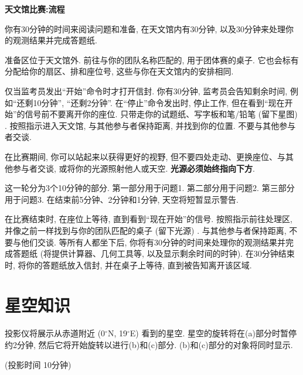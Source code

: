 \documentclass[a4paper,fontset=fandol]{ctexart}
\begin{document}
	{
		\Large\bfseries\noindent 天文馆比赛:\hspace{0.5em}流程
	}
	
	你有30分钟的时间来阅读问题和准备, 在天文馆内有30分钟, 以及30分钟来处理你的观测结果并完成答题纸. 
	
	准备区位于天文馆外. 前往与你的团队名称匹配的, 用于团体赛的桌子. 它也会标有分配给你的扇区、排和座位号, 这些与你在天文馆内的安排相同. 
	
	仅当监考员发出``开始''命令时才打开信封. 你有30分钟, 监考员会告知剩余时间, 例如``还剩10分钟'', ``还剩2分钟''. 在``停止''命令发出时, 停止工作, 但在看到``现在开始''的信号前不要离开你的座位. 只带走你的试题纸、写字板和笔/铅笔 (留下星图) . 按照指示进入天文馆, 与其他参与者保持距离, 并找到你的位置. 不要与其他参与者交谈. 
	
	在比赛期间, 你可以站起来以获得更好的视野, 但不要四处走动、更换座位、与其他参与者交谈, 或将你的光源照射他人或天空. \textbf{光源必须始终指向下方}. 
	
	这一轮分为3个10分钟的部分. 第一部分用于问题1. 第二部分用于问题2. 第三部分用于问题3. 在结束前5分钟、2分钟和1分钟, 天空将短暂显示警告. 
	
	在比赛结束时, 在座位上等待, 直到看到``现在开始''的信号. 按照指示前往处理区, 并像之前一样找到与你的团队匹配的桌子 (留下光源) . 与其他参与者保持距离, 不要与他们交谈. 等所有人都坐下后, 你将有30分钟的时间来处理你的观测结果并完成答题纸 (将提供计算器、几何工具等, 以及显示剩余时间的时钟). 在30分钟结束时, 将你的答题纸放入信封, 并在桌子上等待, 直到被告知离开该区域. 
	
	\newpage
	\section{星空知识}
	
	投影仪将展示从赤道附近 (0$^\circ$N, 19$^\circ$E) 看到的星空. 星空的旋转将在(a)部分时暂停约2分钟, 然后它将开始旋转以进行(b)和(c)部分. (b)和(c)部分的对象将同时显示. 
	
	{\hfill (投影时间 10分钟)}
	
\end{document}
